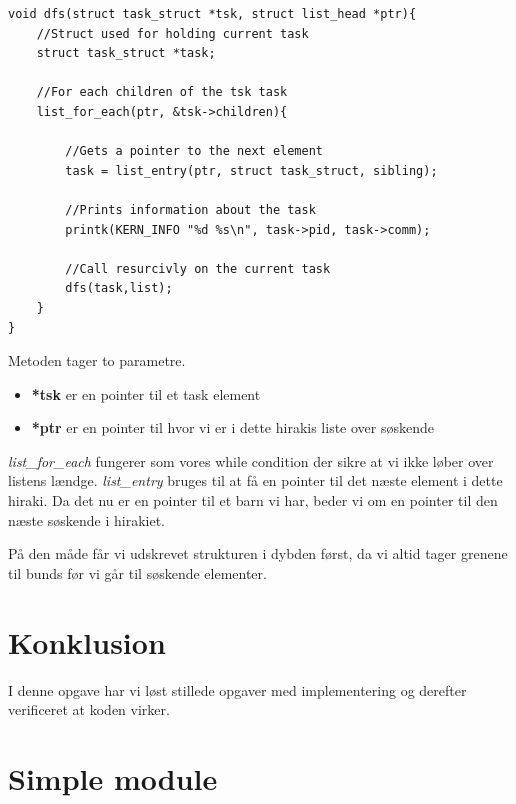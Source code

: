 \documentclass[danish]{report}
\begin{document}
\begin{lstlisting}
void dfs(struct task_struct *tsk, struct list_head *ptr){
	//Struct used for holding current task
	struct task_struct *task;
	
	//For each children of the tsk task
	list_for_each(ptr, &tsk->children){ 
	
		//Gets a pointer to the next element
		task = list_entry(ptr, struct task_struct, sibling); 
		
		//Prints information about the task
		printk(KERN_INFO "%d %s\n", task->pid, task->comm);
		
		//Call resurcivly on the current task
		dfs(task,list);
	}
}
\end{lstlisting}

Metoden tager to parametre.

\begin{itemize}
	\item \textbf{*tsk} er en pointer til et task element
	\item \textbf{*ptr} er en pointer til hvor vi er i dette hirakis liste over søskende
\end{itemize}

\textit{list\_for\_each} fungerer som vores while condition der sikre at vi ikke løber over listens lændge. \textit{list\_entry} bruges til at få en pointer til det næste element i dette hiraki. Da det nu er en pointer til et barn vi har, beder vi om en pointer til den næste søskende i hirakiet.

På den måde får vi udskrevet strukturen i dybden først, da vi altid tager grenene til bunds før vi går til søskende elementer.

\vspace{20 mm}\chapter{Konklusion}
I denne opgave har vi løst stillede opgaver med implementering og derefter verificeret at koden virker.
\endgroup
\appendix
\chapter{Simple module}
\label{simple.c}
\end{document}
